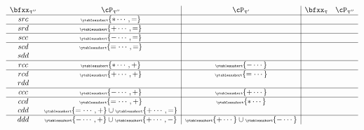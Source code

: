 \documentclass[12pt,a4paper]{amsart}
\numberwithin{equation}{section}
\theoremstyle{remark}
\let\ytb=\ytableaushort
\newcommand{\tytb}[1]{{\tiny\ytb{#1}}}
\def\uptaup{\uptau^{\prime}}
\def\uptaupp{\uptau^{\prime\prime}}
\begin{document}
{\begin{equation} \label{eq:B1-2}
\begin{array}{cc|c|cc}
  \bfxx_{\uptaupp} & \cP_{\uptaupp}         & \cP_{\uptaup} & \bfxx_{\uptau} & \cP_{\uptaupp} \\
  \hline
  src              & \tytb{\ast\cdots ,=} &                                                 \\
  \hline
  srd              & \tytb{+\cdots,=}          &                                                 \\
  \hline
  scc              & \tytb{-\cdots,=}          &                                                 \\
  \hline
  scd              & \tytb{=\cdots,=} &                                                 \\
  sdd              & %
                                            &                                                 \\
  \hline
  rcc              & \tytb{\ast\cdots,+} & \tytb{-\cdots}                                                \\
  \hline
  rcd              & \tytb{+\cdots,+} & \tytb{=\cdots}                             \\
  rdd              & %
                                & \\
  \hline
  ccc              & \tytb{-\cdots,+}          & \tytb{+\cdots}                                               \\
  \hline
  ccd              & \tytb{=\cdots,+}          & \tytb{\ast\cdots}                                             \\
  cdd              & \tytb{=\cdots,+}\cup \tytb{+\cdots,=} & \\
  \hline
  ddd              & \tytb{-\cdots,+}\cup \tytb{+\cdots,-}  &
                                                            \tytb{+\cdots} \cup\tytb{-\cdots}                     \\
\end{array}
\end{equation}

}
\end{document}
